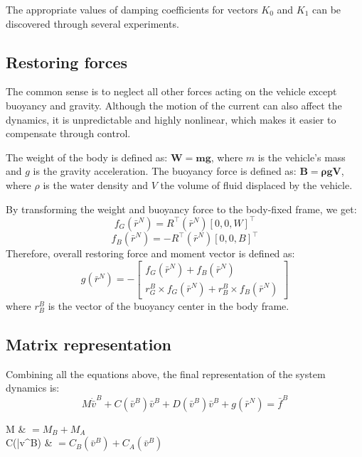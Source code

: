     The appropriate values of damping coefficients for vectors $K_{0}$ and $K_{1}$ can be discovered through several experiments.

\subsection{Restoring forces}

    The common sense is to neglect all other forces acting on the vehicle except buoyancy and gravity. 
    Although the motion of the current can also affect the dynamics, it is unpredictable and highly nonlinear, 
    which makes it easier to compensate through control.

    The weight of the body is defined as: $\mathbf{W=mg}$, where $m$ is the vehicle's mass and $g$ is the gravity acceleration. 
    The buoyancy force is defined as: $\mathbf{B=\boldsymbol{\rho} g V}$, where $\rho$ 
    is the water density and $V$ the volume of fluid displaced by the vehicle. 
    
    By transforming the weight and buoyancy force to the body-fixed frame, we get:
    \begin{equation}
        f_G\left(\bar{r}^N\right)=R^{\top}\left(\bar{r}^N\right)\left[
        0, 
        0, 
        W
        \right]^\top
    \end{equation}
    \begin{equation}
        f_B\left(\bar{r}^N\right)=-R^{\top}\left(\bar{r}^N\right)\left[
        0, 
        0, 
        B
        \right]^\top
    \end{equation}
    Therefore, overall restoring force and moment vector is defined as:
    \begin{equation}
        g(\bar{r}^N)=-\left[\begin{array}{c}
        f_G(\bar{r}^N)+f_B(\bar{r}^N) \\
        r_G^B \times f_G(\bar{r}^N)+r_B^B \times f_B(\bar{r}^N)
        \end{array}\right]
    \end{equation}
    where $r_B^B$ is the vector of the buoyancy center in the body frame. 

\subsection{Matrix representation}

    Combining all the equations above, the final representation of the system dynamics is:
    \begin{equation}
        M \dot{\bar{v}}^B + C(\bar{v}^B) \bar{v}^B+D(\bar{v}^B) \bar{v}^B+g(\bar{r}^N)= \bar{f}^B
        \label{eq::matrix_dynamics}
    \end{equation}
    \begin{conditions}
        \text{\quad} M & $=M_B+M_A$\\
        C(\bar{v}^B) & $=C_B(\bar{v}^B)+C_A(\bar{v}^B)$\\
    \end{conditions}


